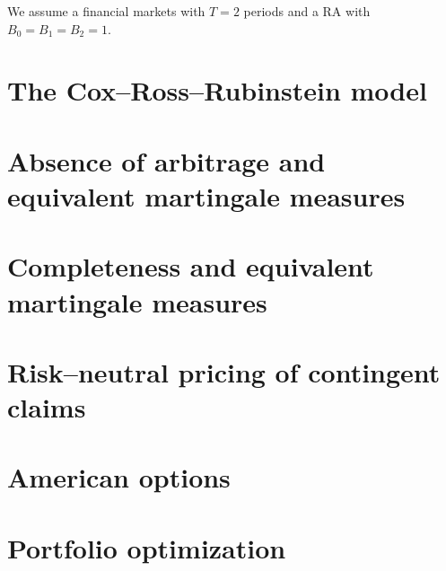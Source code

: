 \documentclass[12pt]{amsart}
\begin{document}
\begin{exercise}
    We assume a financial markets with \(T=2\) periods and a RA with \(B_0 = B_1 = B_2 = 1\).
\end{exercise}


\section{The Cox--Ross--Rubinstein model}
\section{Absence of arbitrage and equivalent martingale measures}
\section{Completeness and equivalent martingale measures}
\section{Risk--neutral pricing of contingent claims}
\section{American options}
\section{Portfolio optimization}
\end{document}
